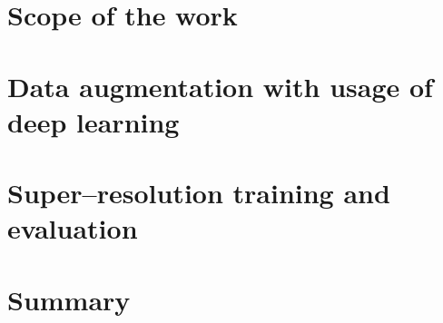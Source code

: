 \documentclass[a4paper, openright, twoside, 12pt]{report}
\begin{document}
\chapter{Scope of the work}
\label{ch:scope}


\chapter{Data augmentation with usage of deep learning}
\label{ch:augmentation}


\chapter{Super--resolution training and evaluation}
\label{ch:sr-evaluation}


\chapter{Summary}
\label{ch:summary}


\begin{appendices}
    
\end{appendices}

\listoffigures
\listoftables
\listofalgorithms
\listoflistings

\nocite{*}


\end{document}
